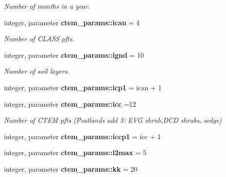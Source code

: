 \begin{DoxyCompactItemize}
\begin{DoxyCompactList}\small\item\em Number of months in a year. \end{DoxyCompactList}\item 
\hypertarget{namespacectem__params_af834d482b4eec80d530f6f6afc9fc5b5}{}integer, parameter {\bfseries ctem\+\_\+params\+::ican} = 4\label{namespacectem__params_af834d482b4eec80d530f6f6afc9fc5b5}

\begin{DoxyCompactList}\small\item\em Number of C\+L\+A\+S\+S pfts. \end{DoxyCompactList}\item 
\hypertarget{namespacectem__params_aa84174d70bc4dcedb2b6edeb859f1507}{}integer, parameter {\bfseries ctem\+\_\+params\+::ignd} = 10\label{namespacectem__params_aa84174d70bc4dcedb2b6edeb859f1507}

\begin{DoxyCompactList}\small\item\em Number of soil layers. \end{DoxyCompactList}\item 
\hypertarget{namespacectem__params_a8b61932a368c557cc3cb7edf6de23e22}{}integer, parameter {\bfseries ctem\+\_\+params\+::icp1} = ican + 1\label{namespacectem__params_a8b61932a368c557cc3cb7edf6de23e22}

\item 
\hypertarget{namespacectem__params_afa448c586accb0aa6dade1df419eb2fd}{}integer, parameter {\bfseries ctem\+\_\+params\+::icc} =12\label{namespacectem__params_afa448c586accb0aa6dade1df419eb2fd}

\begin{DoxyCompactList}\small\item\em Number of C\+T\+E\+M pfts (Peatlands add 3\+: E\+V\+G shrub,D\+C\+D shrubs, sedge) \end{DoxyCompactList}\item 
\hypertarget{namespacectem__params_a1da4b2c80e21cf1adf10e9c7ee9a2189}{}integer, parameter {\bfseries ctem\+\_\+params\+::iccp1} = icc + 1\label{namespacectem__params_a1da4b2c80e21cf1adf10e9c7ee9a2189}

\item 
\hypertarget{namespacectem__params_af57395876febe85e76b0403ab6a4e8ed}{}integer, parameter {\bfseries ctem\+\_\+params\+::l2max} = 5\label{namespacectem__params_af57395876febe85e76b0403ab6a4e8ed}

\item 
\hypertarget{namespacectem__params_a4b2eab1c298364048680641681921e56}{}integer, parameter {\bfseries ctem\+\_\+params\+::kk} = 20\label{namespacectem__params_a4b2eab1c298364048680641681921e56}


\end{DoxyCompactItemize}
